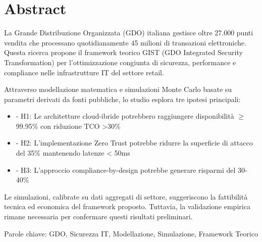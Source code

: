 \chapter*{Abstract}

La Grande Distribuzione Organizzata (GDO) italiana gestisce oltre 27.000 punti 
vendita che processano quotidianamente 45 milioni di transazioni elettroniche. 
Questa ricerca propone il framework teorico GIST (GDO Integrated Security 
Transformation) per l'ottimizzazione congiunta di sicurezza, performance e 
compliance nelle infrastrutture IT del settore retail.

Attraverso modellazione matematica e simulazioni Monte Carlo basate su parametri 
derivati da fonti pubbliche, lo studio esplora tre ipotesi principali:
\begin{itemize}
    \item 
- H1: Le architetture cloud-ibride potrebbero raggiungere disponibilità $\geq$ 99.95\% 
  con riduzione TCO >30\%
  \item 
- H2: L'implementazione Zero Trust potrebbe ridurre la superficie di attacco 
  del 35\% mantenendo latenze < 50ms
  \item 
- H3: L'approccio compliance-by-design potrebbe generare risparmi del 30-40\%
\end{itemize}

Le simulazioni, calibrate su dati aggregati di settore, suggeriscono la 
fattibilità tecnica ed economica del framework proposto. 
Tuttavia, la 
validazione empirica rimane necessaria per confermare questi risultati 
preliminari.

Parole chiave: GDO, Sicurezza IT, Modellazione, Simulazione, Framework Teorico
